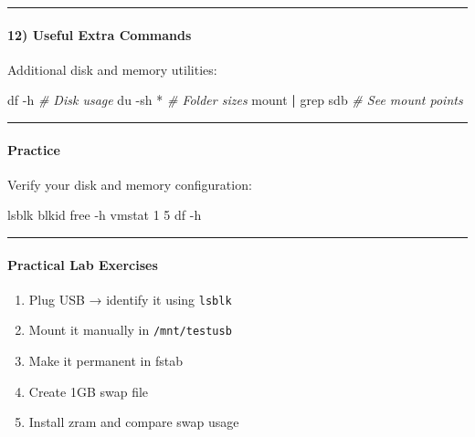 \documentclass[
  english,
  paper=a4,
  oneside  ,captions=tableheading
]{scrartcl}
\newenvironment{Shaded}{}{}
\newcommand{\AttributeTok}[1]{\textcolor[rgb]{0.49,0.56,0.16}{#1}}
\newcommand{\CommentTok}[1]{\textcolor[rgb]{0.38,0.63,0.69}{\textit{#1}}}
\newcommand{\ExtensionTok}[1]{#1}
\newcommand{\FunctionTok}[1]{\textcolor[rgb]{0.02,0.16,0.49}{#1}}
\newcommand{\KeywordTok}[1]{\textcolor[rgb]{0.00,0.44,0.13}{\textbf{#1}}}
\newcommand{\NormalTok}[1]{#1}
\newcommand{\PreprocessorTok}[1]{\textcolor[rgb]{0.74,0.48,0.00}{#1}}
\providecommand{\tightlist}{%
  \setlength{\itemsep}{0pt}\setlength{\parskip}{0pt}}
\begin{document}
\begin{center}\rule{0.5\linewidth}{0.5pt}\end{center}

\paragraph{12) Useful Extra Commands}\label{useful-extra-commands}

Additional disk and memory utilities:

\begin{Shaded}
\begin{Highlighting}[]
\FunctionTok{df} \AttributeTok{{-}h}                 \CommentTok{\# Disk usage}
\FunctionTok{du} \AttributeTok{{-}sh} \PreprocessorTok{*}              \CommentTok{\# Folder sizes}
\FunctionTok{mount} \KeywordTok{|} \FunctionTok{grep}\NormalTok{ sdb      }\CommentTok{\# See mount points}
\end{Highlighting}
\end{Shaded}

\begin{center}\rule{0.5\linewidth}{0.5pt}\end{center}

\paragraph{Practice}\label{practice-1}

Verify your disk and memory configuration:

\begin{Shaded}
\begin{Highlighting}[]
\ExtensionTok{lsblk}
\ExtensionTok{blkid}
\FunctionTok{free} \AttributeTok{{-}h}
\FunctionTok{vmstat}\NormalTok{ 1 5}
\FunctionTok{df} \AttributeTok{{-}h}
\end{Highlighting}
\end{Shaded}

\begin{center}\rule{0.5\linewidth}{0.5pt}\end{center}

\paragraph{Practical Lab Exercises}\label{practical-lab-exercises}

\begin{enumerate}
\def\labelenumi{\arabic{enumi}.}
\tightlist
\item
  Plug USB → identify it using \texttt{lsblk}
\item
  Mount it manually in \texttt{/mnt/testusb}
\item
  Make it permanent in fstab
\item
  Create 1GB swap file
\item
  Install zram and compare swap usage
\end{enumerate}
\end{document}
